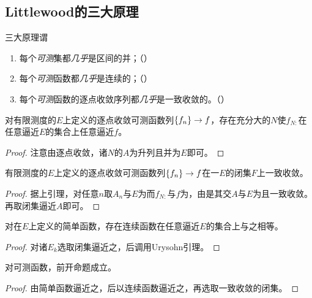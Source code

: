 \documentclass{ctexrep}
\begin{document}
  \subsection{Littlewood的三大原理}
  三大原理谓
  \begin{enumerate}
    \item 每个\emph{可测}集都\emph{几乎}是区间的并；（）
    \item 每个\emph{可测}函数都\emph{几乎}是连续的；（）
    \item 每个\emph{可测}函数的逐点收敛序列都\emph{几乎}是一致收敛的。（）
  \end{enumerate}
  \begin{lemma}
    对有限测度的$E$上定义的逐点收敛可测函数列$\left\{f_n\right\}\to f$，存在充分大的$N$使$f_{N:}$在任意逼近$E$的集合上任意逼近$f$。
  \end{lemma}
  \begin{proof}
    注意由逐点收敛，诸$N$的$A$为升列且并为$E$即可。
  \end{proof}
  \begin{theorem}[Egoroff定理]
    \label{thm:Egoroff}
    有限测度的$E$上定义的逐点收敛可测函数列$\left\{f_n\right\}\to f$在一\epsclo $E$的闭集$F$上一致收敛。
  \end{theorem}
  \begin{proof}
    据上引理，对任意$n$取$A_n$与$E$为而$f_{N:}$与$f$为，由是其交$A$与$E$为\close{\epsilon}且一致收敛。再取闭集逼近$A$即可。
  \end{proof}
  \begin{proposition}
    对在$E$上定义的简单函数，存在连续函数在任意逼近$E$的集合上与之相等。
  \end{proposition}
  \begin{proof}
    对诸$E_k$选取闭集逼近之，后调用Urysohn引理。
  \end{proof}
  \begin{theorem}[Lusin定理]
    \label{thm:Lusin}
    对可测函数，前开命题成立。
  \end{theorem}
  \begin{proof}
    由简单函数逼近之，后以连续函数逼近之，再选取一致收敛的闭集。
  \end{proof}


 
\ifx\allfiles\undefined %
\end{document}
